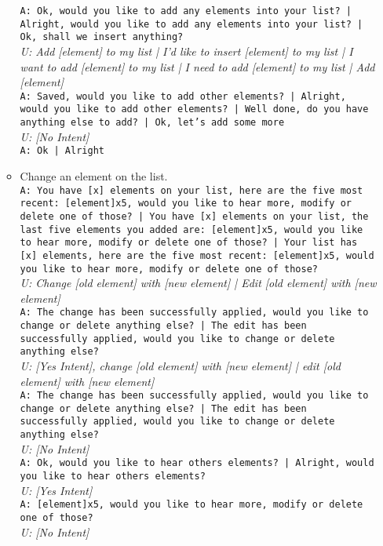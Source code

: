 \begin{itemize}
\begin{itemize}
		\texttt{A: Ok, would you like to add any elements into your list? | Alright, would you like to add any elements into your list? | Ok, shall we insert anything?}\\
		\textit{U: Add [element] to my list | I'd like to insert [element] to my list | I want to add [element] to my list | I need to add [element] to my list | Add [element] }\\
		\texttt{A: Saved, would you like to add other elements? | Alright, would you like to add other elements? | Well done, do you have anything else to add? | Ok, let's add some more}\\
		\textit{U: [No Intent]}\\
		\texttt{A: Ok | Alright}
	
		\item Change an element on the list.\\
		\texttt{A: You have [x] elements on your list, here are the five most recent: [element]x5, would you like to hear more, modify or delete one of those? | You have [x] elements on your list, the last five elements you added are: [element]x5, would you like to hear more, modify or delete one of those? | Your list has [x] elements, here are the five most recent: [element]x5, would you like to hear more, modify or delete one of those?}\\
		\textit{U: Change [old element] with [new element] | Edit [old element] with [new element]}\\
		\texttt{A: The change has been successfully applied, would you like to change or delete anything else? | The edit has been successfully applied, would you like to change or delete anything else?}\\
		\textit{U: [Yes Intent], change [old element] with [new element] | edit [old element] with [new element]}\\
		\texttt{A: The change has been successfully applied, would you like to change or delete anything else? | The edit has been successfully applied, would you like to change or delete anything else?}\\
		\textit{U: [No Intent]}\\
		\texttt{A: Ok, would you like to hear others elements? | Alright, would you like to hear others elements? }\\
		\textit{U: [Yes Intent] }\\
		\texttt{A: [element]x5, would you like to hear more, modify or delete one of those?}\\
		\textit{U: [No Intent] }\\

\end{itemize}
\end{itemize}
